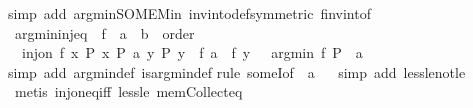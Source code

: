\begin{isabellebody}
%
\isadelimproof
%
\endisadelimproof
%
\isatagproof
{}\isamarkupfalse%
{\isacharparenleft}{\kern0pt}simp\ add{\isacharcolon}{\kern0pt}\ arg{\isacharunderscore}{\kern0pt}min{\isacharunderscore}{\kern0pt}SOME{\isacharunderscore}{\kern0pt}Min\ inv{\isacharunderscore}{\kern0pt}into{\isacharunderscore}{\kern0pt}def{}{\isacharbrackleft}{\kern0pt}symmetric{\isacharbrackright}{\kern0pt}\ f{\isacharunderscore}{\kern0pt}inv{\isacharunderscore}{\kern0pt}into{\isacharunderscore}{\kern0pt}f{\isacharparenright}{\kern0pt}%
\endisatagproof
{\isafoldproof}%
%
\isadelimproof
\isanewline
%
\endisadelimproof
\isanewline
{}\isamarkupfalse%
\ arg{\isacharunderscore}{\kern0pt}min{\isacharunderscore}{\kern0pt}inj{\isacharunderscore}{\kern0pt}eq{\isacharcolon}{\kern0pt}\ \ f\ {\isacharcolon}{\kern0pt}{\isacharcolon}{\kern0pt}\ {\isachardoublequoteopen}{\isacharprime}{\kern0pt}a\ {\isasymRightarrow}\ {\isacharprime}{\kern0pt}b\ {\isacharcolon}{\kern0pt}{\isacharcolon}{\kern0pt}\ order{\isachardoublequoteclose}\isanewline
{}\ {\isachardoublequoteopen}{\isasymlbrakk}\ inj{\isacharunderscore}{\kern0pt}on\ f\ {\isacharbraceleft}{\kern0pt}x{\isachardot}{\kern0pt}\ P\ x{\isacharbraceright}{\kern0pt}{\isacharsemicolon}{\kern0pt}\ P\ a{\isacharsemicolon}{\kern0pt}\ {\isasymforall}y{\isachardot}{\kern0pt}\ P\ y\ {\isasymlongrightarrow}\ f\ a\ {\isasymle}\ f\ y\ {\isasymrbrakk}\ {\isasymLongrightarrow}\ arg{\isacharunderscore}{\kern0pt}min\ f\ P\ {\isacharequal}{\kern0pt}\ a{\isachardoublequoteclose}\isanewline
%
\isadelimproof
%
\endisadelimproof
%
\isatagproof
{}\isamarkupfalse%
{\isacharparenleft}{\kern0pt}simp\ add{\isacharcolon}{\kern0pt}\ arg{\isacharunderscore}{\kern0pt}min{\isacharunderscore}{\kern0pt}def\ is{\isacharunderscore}{\kern0pt}arg{\isacharunderscore}{\kern0pt}min{\isacharunderscore}{\kern0pt}def{\isacharparenright}{\kern0pt}\isanewline
{}\isamarkupfalse%
{\isacharparenleft}{\kern0pt}rule\ someI{}{\isacharbrackleft}{\kern0pt}of\ {\isacharunderscore}{\kern0pt}\ a{\isacharbrackright}{\kern0pt}{\isacharparenright}{\kern0pt}\isanewline
\ \isamarkupfalse%
\ {\isacharparenleft}{\kern0pt}simp\ add{\isacharcolon}{\kern0pt}\ less{\isacharunderscore}{\kern0pt}le{\isacharunderscore}{\kern0pt}not{\isacharunderscore}{\kern0pt}le{\isacharparenright}{\kern0pt}\isanewline
{}\isamarkupfalse%
\ {\isacharparenleft}{\kern0pt}metis\ inj{\isacharunderscore}{\kern0pt}on{\isacharunderscore}{\kern0pt}eq{\isacharunderscore}{\kern0pt}iff\ less{\isacharunderscore}{\kern0pt}le\ mem{\isacharunderscore}{\kern0pt}Collect{\isacharunderscore}{\kern0pt}eq{\isacharparenright}{\kern0pt}%

\end{isabellebody}
